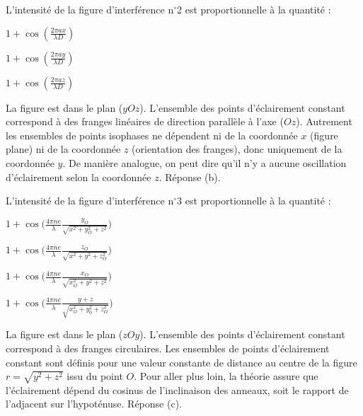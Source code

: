 \newpage


\begin{enonce}
	L'intensité de la figure d'interférence n$^\circ$2 est proportionnelle à la quantité : 
	
	\begin{listeQCM3Colonnes}
		\item $1+ \cos \left(\frac{2\pi a x}{\lambda D} \right)$
		\item $1+ \cos \left(\frac{2\pi a y}{\lambda D} \right)$
		\item $1+ \cos \left(\frac{2\pi a z}{\lambda D} \right)$
	\end{listeQCM3Colonnes}

\end{enonce}

\reponse{\reponseB{}}

\begin{corrige}
	La figure est dans le plan ($yOz$). L'ensemble des points d'éclairement constant correspond à des franges linéaires de direction parallèle à l'axe ($Oz$). Autrement les ensembles de points isophases ne dépendent ni de la coordonnée $x$ (figure plane) ni de la coordonnée $z$ (orientation des franges), donc uniquement de la coordonnée $y$. De manière analogue, on peut dire qu'il n'y a aucune oscillation d'éclairement selon la coordonnée $z$. Réponse (b).
\end{corrige}


\begin{enonce}
	L'intensité de la figure d'interférence n$^\circ$3 est proportionnelle à la quantité : 
	
	\begin{listeQCM2Colonnes}
	\item $1+ \cos \big( \frac{4\pi n e}{\lambda } \frac{y_O}{\sqrt{x^2+y_O^2+z^2}} \big)$
	\item $1+ \cos \big( \frac{4\pi n e}{\lambda }\frac{z_O}{\sqrt{x^2+y^2 +z_O^2}} \big)$
	\item $1+ \cos \big( \frac{4\pi n e}{\lambda } \frac{x_O}{\sqrt{x_O^2+y^2 +z^2}} \big)$
	\item $1+ \cos \big( \frac{4\pi n e}{\lambda }\frac{y + z}{\sqrt{x_O^2+y_0^2 +z_O^2}} \big)$
	\end{listeQCM2Colonnes}

\end{enonce}

\reponse{\reponseC{}}

\begin{corrige}
	La figure est dans le plan ($zOy$). L'ensemble des points d'éclairement constant correspond à des franges circulaires. Les ensembles de points d'éclairement constant sont définis pour une valeur constante de distance au centre de la figure $r=\sqrt{y^2+z^2}$ issu du point $O$. Pour aller plus loin, la théorie assure que l'éclairement dépend du cosinus de l'inclinaison des anneaux, soit le rapport de l'adjacent sur l'hypoténuse. Réponse (c).
\end{corrige}

